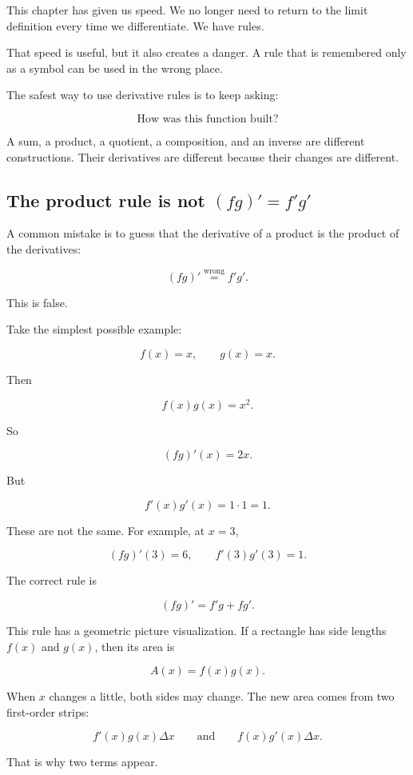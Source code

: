 This chapter has given us speed.  We no longer need to return to the limit definition every time we differentiate.  We have rules.

That speed is useful, but it also creates a danger.  A rule that is remembered only as a symbol can be used in the wrong place.

The safest way to use derivative rules is to keep asking:

\[
\text{How was this function built?}
\]

A sum, a product, a quotient, a composition, and an inverse are different constructions.  Their derivatives are different because their changes are different.

\subsection{The product rule is not \texorpdfstring{\((fg)'=f'g'\)}{(fg)'=f'g'}}
\label{subsec:product-rule-not-product-of-derivatives}

A common mistake is to guess that the derivative of a product is the product of the derivatives:

\[
(fg)' \stackrel{\text{wrong}}{=} f'g'.
\]

This is false.

Take the simplest possible example:

\[
f(x)=x,
\qquad
g(x)=x.
\]

Then

\[
f(x)g(x)=x^2.
\]

So

\[
(fg)'(x)=2x.
\]

But

\[
f'(x)g'(x)=1\cdot1=1.
\]

These are not the same.  For example, at \(x=3\),

\[
(fg)'(3)=6,
\qquad
f'(3)g'(3)=1.
\]

The correct rule is

\[
\boxed{
(fg)'=f'g+fg'.
}
\]

This rule has a geometric picture visualization.  If a rectangle has side lengths \(f(x)\) and \(g(x)\), then its area is

\[
A(x)=f(x)g(x).
\]

When \(x\) changes a little, both sides may change.  The new area comes from two first-order strips:

\[
f'(x)g(x)\Delta x
\qquad\text{and}\qquad
f(x)g'(x)\Delta x.
\]

That is why two terms appear.


